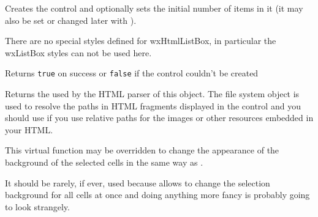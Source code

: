 
Creates the control and optionally sets the initial number of items in it
(it may also be set or changed later with 
).

There are no special styles defined for wxHtmlListBox, in particular the
wxListBox styles can not be used here.

Returns {\tt true} on success or {\tt false} if the control couldn't be created


\label{wxhtmllistboxgetfilesystem}



Returns the  used by the HTML parser of
this object. The file system object is used to resolve the paths in HTML
fragments displayed in the control and you should use 
 if you use
relative paths for the images or other resources embedded in your HTML.


\label{wxhtmllistboxgetselectedtextbgcolour}


This virtual function may be overridden to change the appearance of the
background of the selected cells in the same way as 
.

It should be rarely, if ever, used because 
 allows to
change the selection background for all cells at once and doing anything more
fancy is probably going to look strangely.




\label{wxhtmllistboxgetselectedtextcolour}


